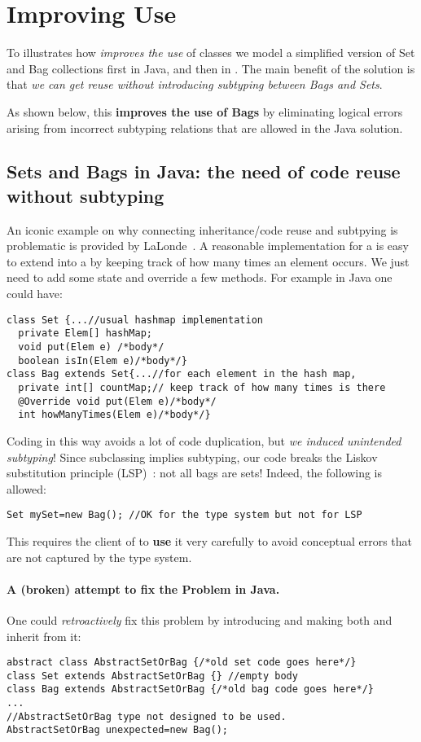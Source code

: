 \section{Improving Use}

To illustrates how 
\name \emph{improves the use} of classes we model a simplified version of
Set and Bag collections first in Java, and then in \name.
The main benefit of the \name solution is that \emph{we can get reuse 
without introducing subtyping between Bags and Sets}. 

As shown below, this \textbf{improves the 
use of Bags} by eliminating logical errors arising from incorrect
subtyping relations that are allowed in the Java solution. 

\subsection{Sets and Bags in Java: the need of code reuse without subtyping}
An iconic example on why connecting inheritance/code reuse and
subtpying is problematic is provided by
LaLonde~\cite{LaLonde:1991:SSS:110673.110679}.  A reasonable
implementation for a \Q@Set@ is easy to extend into a \Q@Bag@ by
keeping track of how many times an element occurs.  We just need to
add some state and override a few methods.
For example in Java one could have:

\begin{lstlisting}
class Set {...//usual hashmap implementation
  private Elem[] hashMap;
  void put(Elem e) /*body*/
  boolean isIn(Elem e)/*body*/}
class Bag extends Set{...//for each element in the hash map,
  private int[] countMap;// keep track of how many times is there
  @Override void put(Elem e)/*body*/
  int howManyTimes(Elem e)/*body*/}
\end{lstlisting}

\noindent Coding \Q@Bag@ in this way avoids a lot of code
duplication, but \emph{we induced unintended subtyping}! 
Since subclassing implies subtyping, our code breaks the Liskov substitution principle (LSP)~\cite{martin2000design}: not all bags are sets!
Indeed, the following is allowed:

\begin{lstlisting}
Set mySet=new Bag(); //OK for the type system but not for LSP
\end{lstlisting}
This requires the client of \Q@Bag@ to \textbf{use} it very carefully to
avoid conceptual errors that are not captured by the type system.


\paragraph{A (broken) attempt to fix the Problem in Java.}
One could \emph{retroactively} fix this problem by introducing \Q@AbstractSetOrBag@
and making both \Q@Bag@ and \Q@Set@ inherit from it:
\begin{lstlisting}
abstract class AbstractSetOrBag {/*old set code goes here*/}
class Set extends AbstractSetOrBag {} //empty body
class Bag extends AbstractSetOrBag {/*old bag code goes here*/}
...
//AbstractSetOrBag type not designed to be used.
AbstractSetOrBag unexpected=new Bag(); 
\end{lstlisting}


